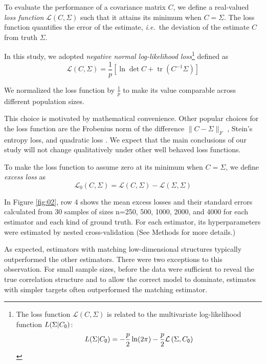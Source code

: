 \documentclass[10pt]{article}
\DeclareMathOperator{\Tr}{tr}
\newcommand{\loss}[1]{\mathcal L\left(#1\right)}
\newcommand{\eloss}[1]{\mathcal L_0\left(#1\right)}
\begin{document}
To evaluate the performance of a covariance matrix $C$, we define a real-valued \emph{loss function} $\loss{C,\Sigma}$ such that it attains its minimum when $C=\Sigma$.  The loss function quantifies the error of the estimate, \emph{i.e.}~the deviation of the estimate $C$ from truth $\Sigma$.

In this study, we adopted \emph{negative normal log-likelihood loss}\footnote{
The loss function $\loss{C,\Sigma}$ is related to the multivariate log-likelihood function $L(\Sigma|C_{\sf 0})$: 
\begin{equation*}
    L(\Sigma|C_{\sf 0}) = -\frac p 2 \ln(2\pi) -\frac p 2 \loss{\Sigma,C_{\sf 0}}
\end{equation*}
}
defined as
\begin{equation}\label{eq:loss}
    \loss{C,\Sigma} = \frac 1 p\left[\ln \det C + \Tr(C^{-1}\Sigma)\right]
\end{equation}

We normalized the loss function  by $\frac 1 p$ to make its value comparable across different population sizes. 

This choice is motivated by mathematical convenience. Other popular choices for the loss function are the Frobenius norm of the difference $\|C-\Sigma\|_F$ \cite{Ledoit:2004,Schafer:2005}, Stein's entropy loss, and quadratic loss \cite{James:1961,Fan:2008}.  We expect that the main conclusions of our study will not change qualitatively under other well behaved loss functions.

To make the loss function to assume zero at its minimum when $C=\Sigma$, we define \emph{excess loss} as
\begin{equation}\label{eq:excess-loss}
    \eloss{C,\Sigma} = \loss{C,\Sigma}-\loss{\Sigma,\Sigma}
\end{equation}

In Figure \ref{fig:02}, row 4 shows the mean excess losses and their standard errors calculated from 30 samples of sizes n=250, 500, 1000, 2000, and 4000 for each estimator and each kind of ground truth. For each estimator, its hyperparameters were estimated by nested cross-validation (See Methods for more details.)

As expected, estimators with matching low-dimensional structures typically outperformed the other estimators. There were two exceptions to this observation. For small sample sizes, before the data were sufficient to reveal the true correlation structure and to  allow the correct model to dominate, estimates with simpler targets often outperformed the matching estimator.
\end{document}
